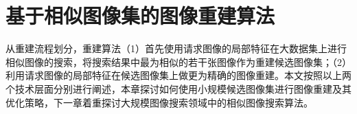 
\chapter{基于相似图像集的图像重建算法}

从重建流程划分，重建算法（1）首先使用请求图像的局部特征在大数据集上进行相似图像的搜索，将搜索结果中最为相似的若干张图像作为重建候选图像集；（2）利用请求图像的局部特征在候选图像集上做更为精确的图像重建。本文按照以上两个技术层面分别进行阐述，本章探讨如何使用小规模候选图像集进行图像重建及其优化策略，下一章着重探讨大规模图像搜索领域中的相似图像搜索算法。




